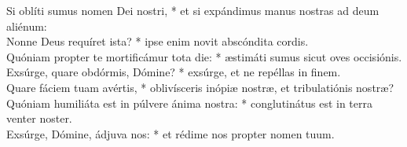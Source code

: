 {	Si oblíti sumus nomen Dei nostri, * et si expándimus manus nostras ad deum aliénum: \\
	Nonne Deus requíret ista? * ipse enim novit abscóndita cordis. \\
	Quóniam propter te mortificámur tota die: * æstimáti sumus sicut oves occisiónis. \\
	Exsúrge, quare obdórmis, Dómine? * exsúrge, et ne repéllas in finem. \\
	Quare fáciem tuam avértis, * oblivísceris inópiæ nostræ, et tribulatiónis nostræ? \\
	Quóniam humiliáta est in púlvere ánima nostra: * conglutinátus est in terra venter noster. \\
	Exsúrge, Dómine, ádjuva nos: * et rédime nos propter nomen tuum. \\
}

